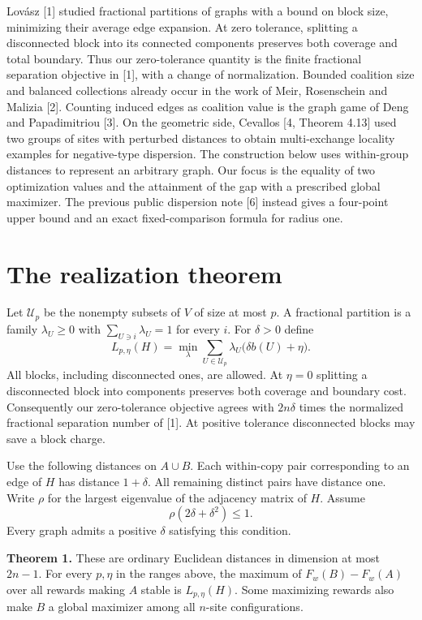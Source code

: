 \documentclass[11pt]{article}
\begin{document}
Lovász [1] studied fractional partitions of graphs with a bound on block size, minimizing their average edge expansion. At zero tolerance, splitting a disconnected block into its connected components preserves both coverage and total boundary. Thus our zero-tolerance quantity is the finite fractional separation objective in [1], with a change of normalization. Bounded coalition size and balanced collections already occur in the work of Meir, Rosenschein and Malizia [2]. Counting induced edges as coalition value is the graph game of Deng and Papadimitriou [3]. On the geometric side, Cevallos [4, Theorem 4.13] used two groups of sites with perturbed distances to obtain multi-exchange locality examples for negative-type dispersion. The construction below uses within-group distances to represent an arbitrary graph. Our focus is the equality of two optimization values and the attainment of the gap with a prescribed global maximizer. The previous public dispersion note [6] instead gives a four-point upper bound and an exact fixed-comparison formula for radius one.

\section{The realization theorem}
Let $\mathcal U_p$ be the nonempty subsets of $V$ of size at most $p$. A fractional partition is a family $\lambda_U\ge0$ with $\sum_{U\ni i}\lambda_U=1$ for every $i$. For $\delta>0$ define
\[
 L_{p,\eta}(H)=\min_{\lambda}\sum_{U\in\mathcal U_p}\lambda_U\bigl(\delta b(U)+\eta\bigr).
\]
All blocks, including disconnected ones, are allowed. At $\eta=0$ splitting a disconnected block into components preserves both coverage and boundary cost. Consequently our zero-tolerance objective agrees with $2n\delta$ times the normalized fractional separation number of [1]. At positive tolerance disconnected blocks may save a block charge.

Use the following distances on $A\cup B$. Each within-copy pair corresponding to an edge of $H$ has distance $1+\delta$. All remaining distinct pairs have distance one. Write $\rho$ for the largest eigenvalue of the adjacency matrix of $H$. Assume
\[
                    \rho(2\delta+\delta^2)\le1 .
\]
Every graph admits a positive $\delta$ satisfying this condition.

\textbf{Theorem 1.} These are ordinary Euclidean distances in dimension at most $2n-1$. For every $p,\eta$ in the ranges above, the maximum of $F_w(B)-F_w(A)$ over all rewards making $A$ stable is $L_{p,\eta}(H)$. Some maximizing rewards also make $B$ a global maximizer among all $n$-site configurations.
\end{document}
